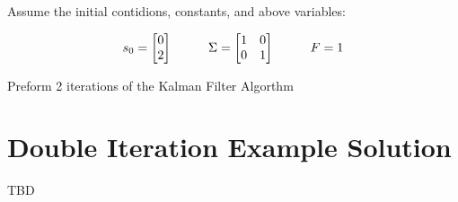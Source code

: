 \documentclass[11pt]{article}
\begin{document}
Assume the initial contidions, constants, and above variables:

\[
s_0 =
\begin{bmatrix}
0\\
2
\end{bmatrix}
\hspace{10mm}
\Sigma =
\begin{bmatrix}
1 & 0\\
0 & 1
\end{bmatrix}
\hspace{10mm}
F = 1
\]

Preform 2 iterations of the Kalman Filter Algorthm

\newpage
\hspace{1mm}
\newpage
\section{Double Iteration Example Solution}
TBD


\end{document}
